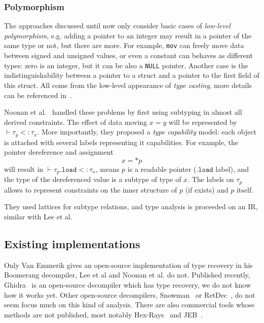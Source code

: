 \documentclass[compsoc,conference,a4paper,10pt,times]{IEEEtran}
\begin{document}
\subsubsection*{Polymorphism}
The approaches discussed until now only consider basic cases of \emph{low-level polymorphism}, e.g.
adding a pointer to an integer may result in a pointer of the same type or not, but there are more.
For example, \texttt{mov} can freely move data between signed and unsigned values, or even a constant
can behaves as different types: zero is an integer, but it can be also a
\texttt{NULL} pointer. Another case is the indistinguishability between a pointer to a struct and
a pointer to the first field of this struct. All come from the low-level appearance of
\emph{type casting}, more details can be referenced in~\cite{siff_coping_1999}.

Noonan et al.~\cite{noonan_polymorphic_2016} handled these problems by first
using subtyping in almost all derived constraints. The effect of data moving $x = y$ will be represented by
$\vdash \tau_{y} <\colon \tau_{x}$. More importantly, they proposed a
\emph{type capability} model: each object is attached with several labels representing it capabilities.
For example, the pointer dereference and assignment
\begin{equation*}
  x = *p
\end{equation*}
will result in $\vdash \tau_{p}.\mathtt{load} <\colon \tau_{x}$, means $p$ is a readable pointer
($\mathtt{.load}$ label), and
the type of the dereferenced value is a subtype of type of $x$. The labels on $\tau_{p}$ allows to
represent constraints on the inner structure of $p$ (if exists) and $p$ itself.

They used lattices for subtype relations, and type analysis is proceeded on an IR,
similar with Lee et al.

\subsection{Existing implementations}
Only Van Emmerik gives an open-source implementation of type recovery in his Boomerang decompiler,
Lee et al and Noonan et al. do not. Published recently, Ghidra~\cite{noauthor_ghidra_nodate} is an
open-source decompiler which has type recovery, we do not know how it works yet.
Other open-source decompilers, Snowman~\cite{noauthor_snowman_nodate} or
RetDec~\cite{kroustek_retdec_2017}, do not seem focus much on this kind of analysis.
There are also commercial tools whose methods are not published,
most notably Hex-Rays~\cite{noauthor_hex-rays_nodate} and JEB~\cite{noauthor_jeb_nodate}.
\end{document}
